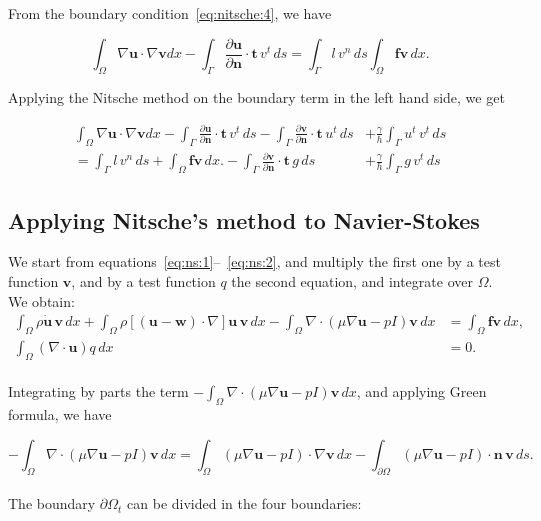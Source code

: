 \documentclass[11pt,a4paper,titlepage]{report}
\begin{document}
From the boundary condition~\eqref{eq:nitsche:4}, we have

\begin{equation}
\int_\Omega \nabla \mathbf{u} \cdot \nabla \mathbf{v} dx
- \int_{\Gamma} \frac{\partial \mathbf{u}}{\partial \mathbf{n}} \cdot \mathbf{t} \, v^t \, ds
=  \int_{\Gamma} l \, v^n \, ds \int_\Omega \mathbf{fv} \, dx.
\end{equation}

Applying the Nitsche method on the boundary term in the left hand side, we get

\begin{align}
\int_\Omega \nabla \mathbf{u} \cdot \nabla \mathbf{v} dx
- \int_{\Gamma} \frac{\partial \mathbf{u}}{\partial \mathbf{n}} \cdot \mathbf{t} \, v^t \, ds 
- \int_{\Gamma} \frac{\partial \mathbf{v}}{\partial \mathbf{n}} \cdot \mathbf{t} \, u^t \, ds
&+ \frac{\gamma}{h} \int_{\Gamma} u^t \, v^t \, ds \\
=  \int_{\Gamma} l \, v^n \, ds
+ \int_\Omega \mathbf{fv} \, dx.
- \int_{\Gamma} \frac{\partial \mathbf{v}}{\partial \mathbf{n}} \cdot \mathbf{t} \, g \, ds
&+ \frac{\gamma}{h} \int_{\Gamma} g \, v^t \, ds
\end{align}

\subsection{Applying Nitsche's method to Navier-Stokes}
We start from equations~\eqref{eq:ns:1}--~\eqref{eq:ns:2}, and multiply the first one by a test function $\mathbf{v}$, and by a test function $q$ the second equation, and integrate over $\Omega$. We obtain:
\begin{align*}
\int_{\Omega} \rho \dot{\mathbf{u}} \, \mathbf{v} \, dx
+ \int_{\Omega} \rho [(\mathbf{u - w}) \cdot \nabla] \mathbf{u} \, \mathbf{v} \, dx
- \int_{\Omega} \nabla \cdot (\mu \nabla \mathbf{u} - pI)\mathbf{v} \, dx
&= \int_{\Omega} \mathbf{f} \mathbf{v} \, dx, \\
\int_{\Omega}  (\nabla \cdot \mathbf{u}) q \, dx &= 0.
\end{align*}
\\
Integrating by parts the term $- \int_{\Omega} \nabla \cdot (\mu \nabla \mathbf{u} - pI)\mathbf{v} \, dx$, and applying Green formula, we have

\[
- \int_{\Omega} \nabla \cdot (\mu \nabla \mathbf{u} - pI)\mathbf{v} \, dx =  \int_{\Omega} (\mu \nabla \mathbf{u} - pI) \cdot \nabla \mathbf{v} \, dx - \int_{\partial \Omega} (\mu \nabla \mathbf{u} - pI) \cdot \mathbf{n} \, \mathbf{v} \, ds.
\]
\\
The boundary $\partial \Omega_t$ can be divided in the four boundaries:
\end{document}

